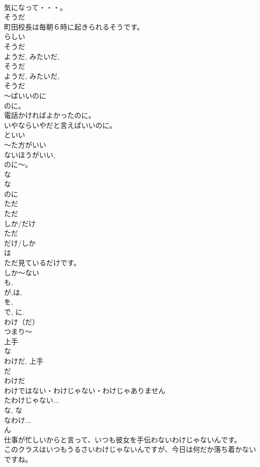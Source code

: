 \documentclass[8pt]{extreport}
\begin{document}
\begin{CJK}{UTF8}{min}
\\	気になって・・・。
\\	そうだ
\\	町田校長は毎朝６時に起きられるそうです。
\\	らしい 
\\	そうだ 
\\	ようだ, みたいだ, 
\\	そうだ 
\\	ようだ, みたいだ, 
\\	そうだ 
\\	～ばいいのに
\\	のに。
\\	電話かければよかったのに。
\\	いやならいやだと言えばいいのに。
\\	といい
\\	～た方がいい
\\	ないほうがいい, 
\\	のに～。
\\	な
\\	な
\\	のに	
\\	ただ
\\	ただ
\\	しか/だけ
\\	ただ
\\	だけ/しか
\\	は
\\	ただ見ているだけです。
\\	しか～ない
\\	も, 
\\	が,は, 
\\	を, 
\\	で, に.
\\	わけ（だ）
\\	つまり～　
\\	上手
\\	な
\\	わけだ, 上手
\\	だ
\\	わけだ
\\	わけではない・わけじゃない・わけじゃありません 
\\	たわけじゃない...
\\	な, な
\\	なわけ...
\\	ん 
\\	仕事が忙しいからと言って、いつも彼女を手伝わないわけじゃないんです。
\\	このクラスはいつもうるさいわけじゃないんですが、今日は何だか落ち着かないですね。

\end{CJK}
\end{document}
